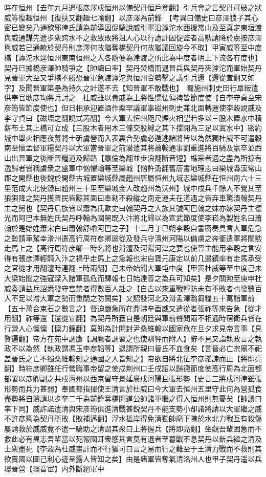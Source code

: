 時在恒州【去年九月遣張彦澤戍恒州以備契丹恒戶登翻】引兵會之言契丹可破之狀威等復趣恒州【復扶又翻趣七喻翻】以彦澤為前鋒　【考異曰備史曰彦澤狼子其心密已變矣乃通欵邪律氏請為前導因促騎說威引軍沿滹沱水西援常山及至真定東垣渡與威通謀先遣步衆跨水不之救致敗將沮人心以行詭計因促監者高勲請降於虜按彦澤與威若已通款於契丹則彦澤何故猶奪橋契丹何故猶議回旋今不取】甲寅威等至中度橋【滹沱水逕恒州東南恒州之人各隨便為津渡之所此為中度者明上下流各冇度也】契丹已據橋彦澤帥騎爭之【帥讀曰率】契丹焚橋而退晉兵與契丹夾滹沱而軍始契丹見晉軍大至又爭橋不勝恐晉軍急渡滹沱與恒州合勢擊之議引兵還【還從宣翻又如字】及聞晉軍築壘為持久之計遂不去【知晉軍不敢戰也】　蜀施州刺史田行臯叛遣供奉官耿彦珣將兵討之　杜威雖以貴戚為上將性懦怯偏禆皆節度使【自李守貞至宋彦筠皆節度使也】但日相承迎置酒作樂罕議軍事磁州刺史兼北面轉運使李穀說威及李守貞曰【磁墻之翻說式芮翻】今大軍去恒州咫尺煙火相望若多以三股木置水中積薪布土其上橋可立成【三股木者用木三條交股縛之其下撑開為三足以寘水中】密約城中舉火相應夜募將士斫虜營而入表裏合勢虜必遁逃諸將皆以為然獨杜威不可遣穀南至懷孟督軍糧契丹以大軍當晉軍之前潜遣其將蕭翰通事劉重進將百騎及羸卒並西山出晉軍之後斷晉糧道及歸路【羸倫為翻並步浪翻斷音短】樵采者遇之盡為所掠有逸歸者皆稱虜衆之盛軍中忷懼翰等至欒城【忷許勇翻舊唐書地理志曰欒城縣漢常山郡之開縣也後魏於開縣古城置欒城縣屬趙州唐屬恒州九域志欒城縣在恒州南六十三里范成大北使録曰趙州三十里至欒城金人改趙州為沃州】城中戍兵千餘人不覺其至狼狽降之契丹獲晉民皆黥其面曰奉勑不殺縱之南走運夫在道遇之皆弃車驚潰翰契丹主之舅也【契丹后族皆以蕭為氏歐史曰翰契丹之大族其號阿巴翰之妹亦嫁契丹主德光而阿巴本無姓氏契丹呼翰為國舅既入汴將北歸以為宣武節度使李崧為製姓名曰蕭翰於是始姓蕭宋白曰蕭翰舒嚕阿巴之子】十二月丁巳朔李穀自書密奏具言大軍危急之勢請車駕幸滑州遣高行周符彦卿扈從及發兵守澶州河陽以備虜之奔衝遣軍將關勲走馬上之【高行周符彦卿一時名將也滑澶及河陽河津之要也使晉主能用李穀之言安得有張彦澤輕騎入汴之禍乎走馬上之急報也宋自寶元康定以前几邉鎮率有走馬承受之官從才用翻澶時連翻上時兩翻】己未帝始聞大軍屯中度【甲寅杜威等至中度己未大梁始聞之強寇深入諸軍孤危而驛報七日始達晉之為兵可知矣】是夕關勲至庚申杜威奏請益兵詔悉發守宫禁者得數百人赴之【自古以來重戰輕防未有不敗者也發數百人不足以增大軍之勢而重閉之防闕矣】又詔發河北及滑孟澤潞芻糧五十萬詣軍前【五十萬合束石之數言之】督迫嚴急所在鼎沸辛酉威又遣從者張祚等來告急【從才用翻】祚等還【還從宣翻】為契丹所獲自是朝廷與軍前聲問兩不相通時宿衛兵皆在行營人心懍懍【懔力錦翻】莫知為計開封尹桑維翰以國家危在旦夕求見帝言事【見賢遍翻】帝方在苑中調鷹【調鷹者調習之也使馴狎而附人】辭不見又詣執政言之執政不以為然【執政謂馮玉李彦韜等】退謂所親曰晉氏不血食矣【言晉必亡宗廟不祀盖晉氏之亡不獨桑維翰知之通國之人皆知之】帝欲自將北征李彦韜諫而止【將即亮翻】時符彦卿雖任行營職事帝留之使戍荆州口壬戌詔以歸德節度使高行周為北面都部署以彦卿副之共戍澶州以西京留守景延廣戌河陽且張形勢【史言三將戍河津雖張形勢而兵力甚弱】奉國都指揮使王清言於杜威曰今大軍去恒州五里守此何為營孤食盡勢將自潰請以步卒二千為前鋒奪橋開道公帥諸軍繼之得入恒州則無憂矣【帥讀曰率下同】威許諾遣清與宋彦筠俱進清戰甚鋭契丹不能支勢小却諸將請以大軍繼之威不許彦筠為契丹所敗【敗補邁翻】浮水抵岸得免清獨帥麾下陳於水北力戰互有殺傷屢請救於威威竟不遣一騎助之清謂其衆曰上將握兵【將即亮翻】坐觀吾輩困急而不救此必有異志吾輩當以死報國耳衆感其言莫有退者至暮戰不息契丹以新兵繼之清及士衆盡死【李穀為杜威畫計而不行猶可曰言之易而行之難至于王清力戰而不救則其欲賣國以圖己利心迹呈露人皆知之矣】由是諸軍皆奪氣清洺州人也甲子契丹遥以兵環晉營【環音宦】内外斷絕軍中